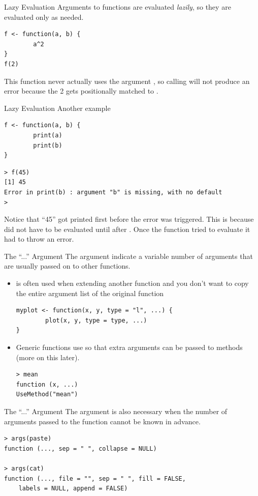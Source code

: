 \documentclass[aspectratio=169]{beamer}
\begin{document}
\begin{frame}[fragile]{Lazy Evaluation}
Arguments to functions are evaluated \textit{lazily}, so they are
evaluated only as needed.
\begin{verbatim}
f <- function(a, b) {
        a^2
}
f(2)
\end{verbatim}
This function never actually uses the argument , so calling
 will not produce an error because the 2 gets positionally
matched to .  
\end{frame}

\begin{frame}[fragile]{Lazy Evaluation}
Another example
\begin{verbatim}
f <- function(a, b) {
        print(a)
        print(b)
}
\end{verbatim}
\begin{verbatim}
> f(45)
[1] 45
Error in print(b) : argument "b" is missing, with no default
> 
\end{verbatim}
Notice that ``45'' got printed first before the error was triggered.
This is because  did not have to be evaluated until after
.  Once the function tried to evaluate 
it had to throw an error.
\end{frame}

\begin{frame}[fragile]{The ``...'' Argument}
The  argument indicate a variable number of arguments that
are usually passed on to other functions.
\begin{itemize}
\item
{} is often used when extending another function and you don't
want to copy the entire argument list of the original function
\begin{verbatim}
myplot <- function(x, y, type = "l", ...) {
        plot(x, y, type = type, ...)
}
\end{verbatim}
\item
Generic functions use  so that extra arguments can be passed
to methods (more on this later).
\begin{verbatim}
> mean
function (x, ...) 
UseMethod("mean")
\end{verbatim}
\end{itemize}
\end{frame}

\begin{frame}[fragile]{The ``...'' Argument}
The  argument is also necessary when the number of arguments
passed to the function cannot be known in advance.
\begin{verbatim}
> args(paste)
function (..., sep = " ", collapse = NULL) 

> args(cat)
function (..., file = "", sep = " ", fill = FALSE, 
    labels = NULL, append = FALSE) 
\end{verbatim}
\end{frame}
\end{document}
